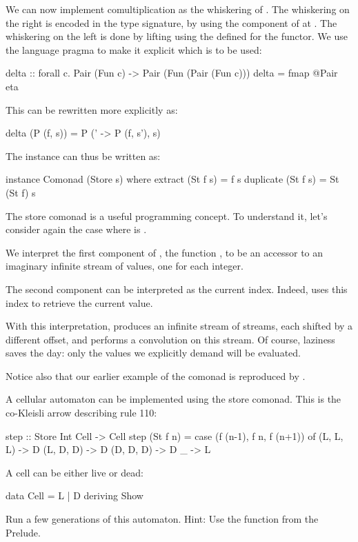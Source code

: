 \documentclass[DaoFP]{subfiles}
\begin{document}
We can now implement comultiplication as the whiskering of . The whiskering on the right is encoded in the type signature, by using the component of  at . The whiskering on the left is done by lifting  using the  defined for the  functor. We use the language pragma  to make it explicit which  is to be used:
\begin{haskell}
delta :: forall c. Pair (Fun c) -> Pair (Fun (Pair (Fun c)))
delta = fmap @Pair eta
\end{haskell}
This can be rewritten more explicitly as:
\begin{haskell}
delta (P (f, s)) = P (\s' -> P (f, s'), s)
\end{haskell}

The  instance can thus be written as:
\begin{haskell}
instance Comonad (Store s) where
  extract (St f s) = f s
  duplicate (St f s) = St (St f) s
\end{haskell}

The store comonad is a useful programming concept. To understand it, let's consider again the case where  is . 

We interpret the first component of , the function , to be an accessor to an imaginary infinite stream of values, one for each integer. 

The second component can be interpreted as the current index. Indeed,  uses this index to retrieve the current value.

With this interpretation,  produces an infinite stream of streams, each shifted by a different offset, and  performs a convolution on this stream. Of course, laziness saves the day: only the values we explicitly demand will be evaluated.

Notice also that our earlier example of the  comonad is reproduced by .

\begin{exercise}
A cellular automaton can be implemented using the store comonad. This is the co-Kleisli arrow describing rule 110:
\begin{haskell}
step :: Store Int Cell -> Cell
step (St f n) = 
    case (f (n-1), f n, f (n+1)) of
    (L, L, L) -> D
    (L, D, D) -> D
    (D, D, D) -> D
    _ -> L
\end{haskell}
A cell can be either live or dead:
\begin{haskell}
data Cell = L | D 
    deriving Show
\end{haskell}
Run a few generations of this automaton. Hint: Use the function  from the Prelude.
\end{exercise}
\end{document}
